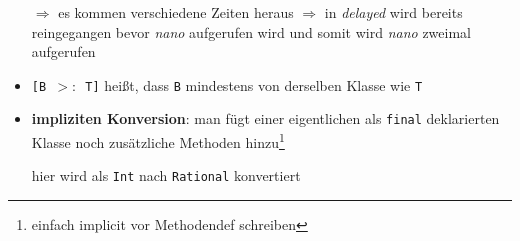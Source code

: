 \begin{itemize}
  
  
  $\Rightarrow$ es kommen verschiedene Zeiten heraus $\Rightarrow$ in
  \textit{delayed} wird bereits reingegangen bevor \textit{nano} 
  aufgerufen wird und somit wird \textit{nano} zweimal aufgerufen
  \item \texttt{[B $>:$ T]} heißt, dass \texttt{B} mindestens von derselben
  Klasse wie \texttt{T}
  \item \textbf{impliziten Konversion}: man fügt einer eigentlichen als 
  \texttt{final} deklarierten Klasse noch
  zusätzliche Methoden hinzu\footnote{einfach implicit vor Methodendef
  schreiben}
  
  
  
  hier wird als \texttt{Int} nach \texttt{Rational} konvertiert
  

\end{itemize}
